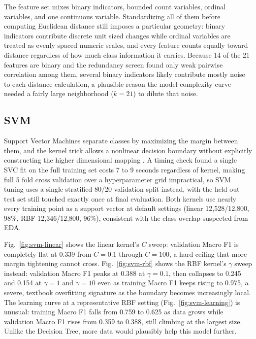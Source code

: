 \documentclass[conference]{IEEEtran}
\begin{document}
The feature set mixes binary indicators, bounded count variables, ordinal variables, and one continuous variable. Standardizing all of them before computing Euclidean distance still imposes a particular geometry: binary indicators contribute discrete unit sized changes while ordinal variables are treated as evenly spaced numeric scales, and every feature counts equally toward distance regardless of how much class information it carries. Because 14 of the 21 features are binary and the redundancy screen found only weak pairwise correlation among them, several binary indicators likely contribute mostly noise to each distance calculation, a plausible reason the model complexity curve needed a fairly large neighborhood ($k=21$) to dilute that noise.

\subsection{SVM}

Support Vector Machines separate classes by maximizing the margin between them, and the kernel trick allows a nonlinear decision boundary without explicitly constructing the higher dimensional mapping \cite{cortes1995}. A timing check found a single SVC fit on the full training set costs 7 to 9 seconds regardless of kernel, making full 5 fold cross validation over a hyperparameter grid impractical, so SVM tuning uses a single stratified 80/20 validation split instead, with the held out test set still touched exactly once at final evaluation. Both kernels use nearly every training point as a support vector at default settings (linear 12{,}528/12{,}800, 98\%, RBF 12{,}346/12{,}800, 96\%), consistent with the class overlap suspected from EDA.

Fig.~\ref{fig:svm-linear} shows the linear kernel's $C$ sweep: validation Macro F1 is completely flat at 0.339 from $C=0.1$ through $C=100$, a hard ceiling that more margin tightening cannot cross. Fig.~\ref{fig:svm-rbf} shows the RBF kernel's $\gamma$ sweep instead: validation Macro F1 peaks at 0.388 at $\gamma=0.1$, then collapses to 0.245 and 0.154 at $\gamma=1$ and $\gamma=10$ even as training Macro F1 keeps rising to 0.975, a severe, textbook overfitting signature as the boundary becomes increasingly local. The learning curve at a representative RBF setting (Fig.~\ref{fig:svm-learning}) is unusual: training Macro F1 falls from 0.759 to 0.625 as data grows while validation Macro F1 rises from 0.359 to 0.388, still climbing at the largest size. Unlike the Decision Tree, more data would plausibly help this model further.
\end{document}
